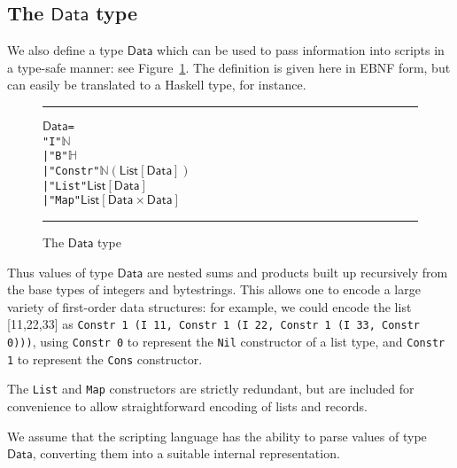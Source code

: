 \documentclass[a4paper]{article}
\newcommand{\s}{\textsf}  %
\newcommand\rfskip{7pt}
\newenvironment{ruledfigure}[1]{\begin{figure}[#1]\hrule\vspace{\rfskip}}{\vspace{\rfskip}\hrule\end{figure}}
\newcommand{\List}[1]{\ensuremath{\s{List}[#1]}}
\newcommand{\Data}{\ensuremath{\mathsf{Data}}}
\newcommand\N{\ensuremath{\mathbb{N}}}
\renewcommand\H{\ensuremath{\mathbb{H}}}
\begin{document}
\subsection{The \Data{} type}
We also define a type \Data{} which can be used to pass information
into scripts in a type-safe manner: see Figure~\ref{fig:data-defn}. The
definition is given here in EBNF form, but can easily be translated to
a Haskell type, for instance.

\begin{ruledfigure}{H}
\begin{alltt}
  \Data =
      "I" \(\N\)
    | "B" \(\H\)
    | "Constr" \(\N (\List{\Data})\)
    | "List" \(\List{\Data}\)
    | "Map" \(\List{\Data\times\Data}\)
\end{alltt}
\caption{The \Data{} type}
\label{fig:data-defn}
\end{ruledfigure}

\noindent Thus values of type \Data{} are nested sums and products built up
recursively from the base types of integers and bytestrings. This
allows one to encode a large variety of first-order data structures:
for example, we could encode the list [11,22,33] as \texttt{Constr 1
  (I 11, Constr 1 (I 22, Constr 1 (I 33, Constr 0)))}, using
\texttt{Constr 0} to represent the \texttt{Nil} constructor of a list
type, and \texttt{Constr 1} to represent the \texttt{Cons}
constructor.

The \texttt{List} and \texttt{Map} constructors are strictly
redundant, but are included for convenience to allow straightforward
encoding of lists and records.

We assume that the scripting language has the ability to parse values
of type \Data{}, converting them into a suitable internal representation.
\end{document}
